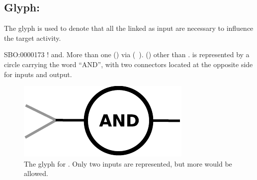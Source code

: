 \subsection{Glyph: }
\label{sec:af:and}

The glyph  is used to denote that all the  linked as input are necessary to influence the target activity.

\begin{glyphDescription}
 \glyphSboTerm SBO:0000173 ! and.
 \glyphOrigin More than one  () via  (~).
 \glyphTarget  {} () other than .
 \glyphNode {} is represented by a circle carrying the word ``AND'',  with two connectors located at the opposite side for inputs and output.
\end{glyphDescription}

\begin{figure}[H]
  \centering
  \includegraphics[scale = 0.5]{images/build/and.pdf}
  \caption{The \AF glyph for . Only two inputs are represented, but more would be allowed.}
  \label{fig:af:and}
\end{figure}
